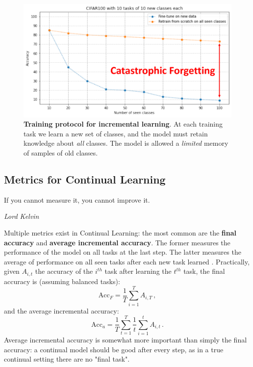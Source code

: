 \begin{figure}[tb]
      \begin{center}
            \includegraphics[width=0.8\linewidth]{images/related/catastrophic_forgetting.pdf}
      \end{center}
      \caption{\textbf{Training protocol for incremental learning}. At each training task we learn a
            new set of classes, and the model must retain knowledge about \textit{all} classes. The
            model is allowed a \textit{limited} memory of samples of old classes.}
      \label{fig:related_forgetting}
\end{figure}


%

\subsection{Metrics for Continual Learning}
\label{sec:related_metrics}

\epigraph{If you cannot measure it, you cannot improve it.}{\textit{Lord Kelvin}}

Multiple metrics exist in Continual Learning: the most common are the \textbf{final accuracy} and
\textbf{average incremental accuracy}. The former measures the performance of the model on all tasks
at the last step. The latter measures the average of performance on all seen tasks after each new
task learned \citep{rebuffi2017icarl}. Practically, given $A_{i,t}$ the accuracy of the $i^{th}$
task after
learning the $t^{th}$ task, the final accuracy is (assuming balanced tasks):
%
\begin{equation}
      \text{Acc}_F = \frac{1}{T} \sum_{i=1}^T A_{i,T}\,,
      \label{eq:related_final_acc}
\end{equation}
%
and the average incremental accuracy:
%
\begin{equation}
      \text{Acc}_a = \frac{1}{T} \sum_{t=1}^T \frac{1}{t}  \sum_{i=1}^t A_{i,t}\,.
      \label{eq:related_avg_acc}
\end{equation}
%
Average incremental accuracy is somewhat more important than simply the final accuracy: a continual
model should be good after every step, as in a true continual setting there are no "final task".

